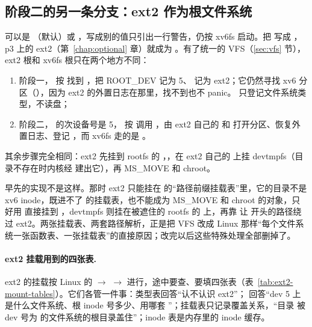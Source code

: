 \subsection{阶段二的另一条分支：ext2 作为根文件系统}
\label{sec:ext2-root}

 可以是 （默认）或 ，写成别的值只引出一行警告，仍按 xv6fs 启动。把  写成 ，p3 上的 ext2（第~\ref{chap:optional} 章）就成为 \code{/}。有了统一的 VFS（\ref{sec:vfs} 节），ext2 根和 xv6fs 根只在两个地方不同：

\begin{enumerate}
  \item 阶段一， 按  找到 ，把 ROOT\_DEV 记为 5、 记为 ext2；它仍然寻找 xv6 分区（），因为 ext2 的外置日志在那里，找不到也不 panic。 只登记文件系统类型，不读盘；
  \item 阶段二， 的次设备号是 5， 按  调用 ，由 ext2 自己的  和  打开分区、恢复外置日志、登记 ，而 xv6fs 走的是 。
\end{enumerate}

其余步骤完全相同：ext2 先挂到 rootfs 的 ，，在 ext2 自己的  上挂 devtmpfs（目录不存在时内核经  建出它），再 MS\_MOVE 和 chroot。

\begin{note}
  早先的实现不是这样。那时 ext2 只能挂在  的“路径前缀挂载表”里，它的目录不是 xv6 inode，既进不了  的挂载表，也不能成为 MS\_MOVE 和 chroot 的对象，只好用  直接挂到 \code{/}，devtmpfs 则挂在被遮住的 rootfs 的  上，再靠  让  开头的路径绕过 ext2。两张挂载表、两套路径解析，正是把 VFS 改成 Linux 那样“每个文件系统一张函数表、一张挂载表”的直接原因；改完以后这些特殊处理全部删掉了。
\end{note}

\paragraph{ext2 挂载用到的四张表.}
\label{sec:ext2-mount}
ext2 的挂载按 Linux 的  $\to$  $\to$  进行，途中要查、要填四张表（表~\ref{tab:ext2-mount-tables}）。它们各管一件事：类型表回答“认不认识 ext2”； 回答“dev 5 上是什么文件系统、根 inode 号多少、用哪套 ”；挂载表只记录覆盖关系，“目录  被 dev 号为  的文件系统的根目录盖住”；inode 表是内存里的 inode 缓存。

